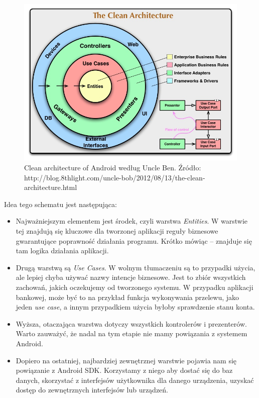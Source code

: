 \begin{figure}[!htb]
    \centering
    \includegraphics[width=13cm]{imgs/ch4_clean_architecture.jpg}
    \caption
{Clean architecture of Android według Uncle Ben. Źródło: http://blog.8thlight.com/uncle-bob/2012/08/13/the-clean-architecture.html}
    \label{fig:clean architecture}
\end{figure} 

Idea tego schematu jest następująca:

\begin{itemize}

\item
Najważniejszym elementem jest środek, czyli warstwa \textit{Entities}. W warstwie tej znajdują się kluczowe dla tworzonej aplikacji reguły biznesowe gwarantujące poprawność działania programu. Krótko mówiąc – znajduje się tam logika działania aplikacji.
\item
Drugą warstwą są \textit{Use Cases}. W wolnym tłumaczeniu są to przypadki użycia, ale lepiej chyba używać nazwy intencje biznesowe. Jest to zbiór wszystkich zachowań, jakich oczekujemy od tworzonego systemu. W przypadku aplikacji bankowej, może być to na przykład funkcja wykonywania przelewu, jako jeden \textit{use case}, a innym przypadkiem użycia byłoby sprawdzenie stanu konta.
\item
Wyższa, otaczająca warstwa dotyczy wszystkich kontrolerów i prezenterów. Warto zauważyć, że nadal na tym etapie nie mamy powiązania z systemem Android.
\item
Dopiero na ostatniej, najbardziej zewnętrznej warstwie pojawia nam się powiązanie z Android SDK. Korzystamy z niego aby dostać się do baz danych, skorzystać z interfejsów użytkownika dla danego urządzenia, uzyskać dostęp do zewnętrznych interfejsów lub urządzeń.
\end{itemize}

